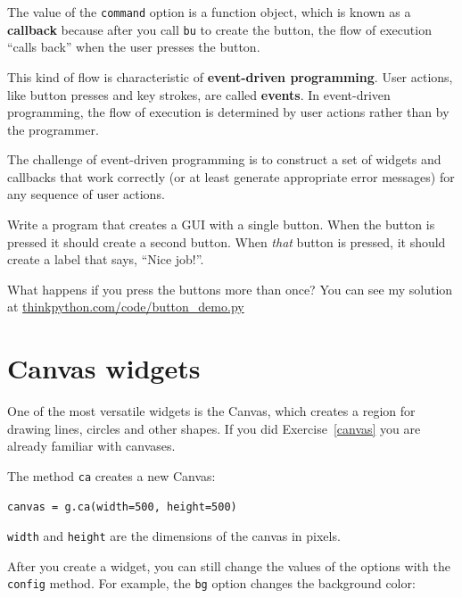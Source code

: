 \documentclass[10pt]{book}
\begin{document}

The value of the {\tt command} option
is a function object, which is known as a {\bf callback} because
after you call {\tt bu} to create the button, the flow of execution
``calls back'' when the user presses the button.


This kind of flow is characteristic of {\bf event-driven programming}.
User actions, like button presses and key strokes, are called {\bf
events}.  In event-driven programming, the flow of execution is
determined by user actions rather than by the programmer.  

The challenge of event-driven programming is to construct a set of
widgets and callbacks that work correctly (or at least generate
appropriate error messages) for any sequence of user actions.

\begin{ex}
Write a program that creates a GUI with a single button.  When the
button is pressed it should create a second button.  When
{\em that} button is pressed, it should create a label that
says, ``Nice job!''.

What happens if you press the buttons more than once?
You can see my solution at \url{thinkpython.com/code/button_demo.py}

\end{ex}


\section{Canvas widgets}


One of the most versatile widgets is the Canvas, which creates
a region for drawing lines, circles and other shapes.  If you
did Exercise~\ref{canvas} you are already familiar with canvases.

The method {\tt ca} creates a new Canvas:

\beforeverb
\begin{verbatim}
canvas = g.ca(width=500, height=500)
\end{verbatim}
\afterverb
%
{\tt width} and {\tt height} are the dimensions of the canvas
in pixels.  


After you create a widget, you can still change the values of
the options with the
{\tt config} method.  For example, the {\tt bg} option changes
the background color:
\end{document}
